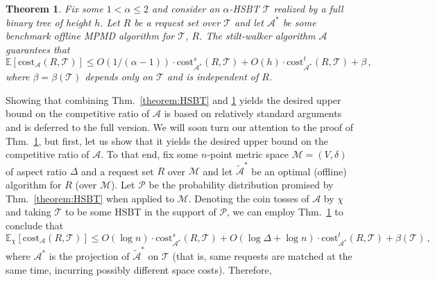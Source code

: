 \documentclass[11pt]{article}
\def\LongVersion{}
\def\ShortVersion{}
\def\ShortVersionEnd{}
\newtheorem{theorem}{Theorem}[section]
\theoremstyle{definition}
\theoremstyle{plain}
\newtheorem{theorem}{Theorem}
\theoremstyle{definition}
\theoremstyle{plain}
\newtheorem{theorem}{Theorem}[section]
\theoremstyle{definition}
\theoremstyle{plain}
\newcommand{\Thm}{Thm.}
\newcommand{\Expect}{\mathbb{E}}
\newcommand{\sCost}{\mathrm{cost}^{\mathit{s}}}
\newcommand{\tCost}{\mathrm{cost}^{\mathit{t}}}
\newcommand{\Cost}{\mathrm{cost}}
\newcommand{\A}{\mathcal{A}}
\newcommand{\adv}[1]{{#1}^{*}}
\begin{document}
\begin{theorem} \label{theorem:main}
Fix some $1 < \alpha \leq 2$ and consider an $\alpha$-HSBT $\mathcal{T}$
realized by a full binary tree of height $h$.
Let $R$ be a request set over $\mathcal{T}$ and let $\adv{\A}$ be
some benchmark offline MPMD algorithm for $\mathcal{T}$, $R$.
The stilt-walker algorithm $\A$ guarantees that
\[
\Expect \left[ \Cost_{\A} \left( R, \mathcal{T} \right) \right]
\leq
O (1 / (\alpha - 1)) \cdot \sCost_{\adv{\A}} \left( R,
\mathcal{T} \right)
+
O (h) \cdot \tCost_{\adv{\A}} \left( R, \mathcal{T} \right)
+
\beta  \, ,
\]
where
$\beta = \beta(\mathcal{T})$
depends only on $\mathcal{T}$ and is independent of $R$.
\end{theorem}

\ShortVersion %
Showing that combining \Thm{}\ \ref{theorem:HSBT} and \ref{theorem:main}
yields the desired upper bound on the competitive ratio of $\A$ is based on
relatively standard arguments and is deferred to the full version.
\ShortVersionEnd %
%
\LongVersion %
We will soon turn our attention to the proof of \Thm{}~\ref{theorem:main},
but first, let us show that it yields the desired upper bound on the
competitive ratio of $\A$.
To that end, fix some $n$-point metric space
$\mathcal{M} = (V, \delta)$
of aspect ratio $\Delta$ and a request set $R$ over $\mathcal{M}$ and let
$\widetilde{\A}^{*}$ be an optimal (offline) algorithm for $R$ (over
$\mathcal{M}$).
Let $\mathcal{P}$ be the probability distribution promised by
\Thm{}~\ref{theorem:HSBT} when applied to $\mathcal{M}$.
Denoting the coin tosses of $\A$ by $\chi$ and taking $\mathcal{T}$ to be some
HSBT in the support of $\mathcal{P}$, we can employ \Thm{}~\ref{theorem:main}
to conclude that
\[
\Expect_{\chi} \left[ \Cost_{\A} \left( R,
\mathcal{T} \right) \right]
\leq
O (\log n) \cdot \sCost_{\A^{*}} \left( R, \mathcal{T} \right)
+
O (\log \Delta + \log n) \cdot \tCost_{\A^{*}} \left( R, \mathcal{T}
\right)
+
\beta(\mathcal{T}) \, ,
\]
where $\A^{*}$ is the projection of $\widetilde{\A}^{*}$ on $\mathcal{T}$
(that is, same requests are matched at the same time, incurring possibly
different space costs).
Therefore,
\end{document}
